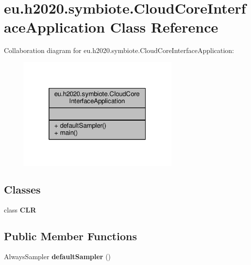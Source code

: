 \hypertarget{classeu_1_1h2020_1_1symbiote_1_1CloudCoreInterfaceApplication}{}\section{eu.\+h2020.\+symbiote.\+Cloud\+Core\+Interface\+Application Class Reference}
\label{classeu_1_1h2020_1_1symbiote_1_1CloudCoreInterfaceApplication}


Collaboration diagram for eu.\+h2020.\+symbiote.\+Cloud\+Core\+Interface\+Application\+:
\nopagebreak
\begin{figure}[H]
\begin{center}
\leavevmode
\includegraphics[width=229pt]{classeu_1_1h2020_1_1symbiote_1_1CloudCoreInterfaceApplication__coll__graph}
\end{center}
\end{figure}
\subsection*{Classes}
\begin{DoxyCompactItemize}
\item 
class {\bfseries C\+LR}
\end{DoxyCompactItemize}
\subsection*{Public Member Functions}
\begin{DoxyCompactItemize}
\item 
Always\+Sampler {\bfseries default\+Sampler} ()\hypertarget{classeu_1_1h2020_1_1symbiote_1_1CloudCoreInterfaceApplication_a12ccc55e03aebfb165dd037cefc9bb78}{}\label{classeu_1_1h2020_1_1symbiote_1_1CloudCoreInterfaceApplication_a12ccc55e03aebfb165dd037cefc9bb78}

\end{DoxyCompactItemize}
